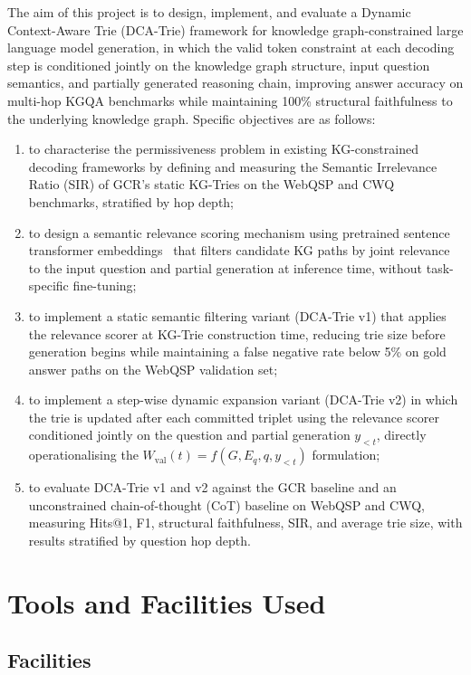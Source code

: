 The aim of this project is to design, implement, and evaluate a Dynamic Context-Aware Trie (DCA-Trie) framework for knowledge graph-constrained large language model generation, in which the valid token constraint at each decoding step is conditioned jointly on the knowledge graph structure, input question semantics, and partially generated reasoning chain, improving answer accuracy on multi-hop KGQA benchmarks while maintaining 100\% structural faithfulness to the underlying knowledge graph. Specific objectives are as follows:

\begin{enumerate}[label=\roman*.]
  \item to characterise the permissiveness problem in existing KG-constrained decoding frameworks by defining and measuring the Semantic Irrelevance Ratio (SIR) of GCR's static KG-Tries on the WebQSP and CWQ benchmarks, stratified by hop depth;
  \item to design a semantic relevance scoring mechanism using pretrained sentence transformer embeddings~\citep{reimers2019sbert} that filters candidate KG paths by joint relevance to the input question and partial generation at inference time, without task-specific fine-tuning;
  \item to implement a static semantic filtering variant (DCA-Trie v1) that applies the relevance scorer at KG-Trie construction time, reducing trie size before generation begins while maintaining a false negative rate below 5\% on gold answer paths on the WebQSP validation set;
  \item to implement a step-wise dynamic expansion variant (DCA-Trie v2) in which the trie is updated after each committed triplet using the relevance scorer conditioned jointly on the question and partial generation $y_{<t}$, directly operationalising the $W_{\mathrm{val}}(t) = f(G, E_q, q, y_{<t})$ formulation;
  \item to evaluate DCA-Trie v1 and v2 against the GCR baseline and an unconstrained chain-of-thought (CoT) baseline on WebQSP and CWQ, measuring Hits@1, F1, structural faithfulness, SIR, and average trie size, with results stratified by question hop depth.
\end{enumerate}

\section{Tools and Facilities Used}

\subsection{Facilities}


